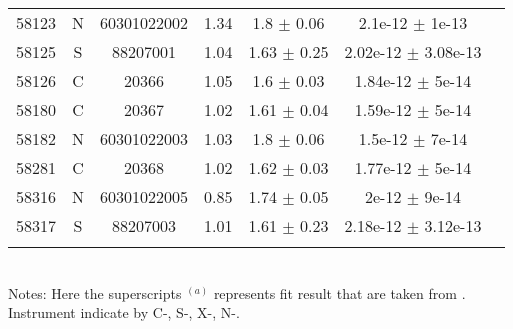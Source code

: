 \begin{table}
\begin{tabular}{lcccccc}
58123 & N & 60301022002 & 1.34 & 1.8 $\pm$ 0.06 & 2.1e-12 $\pm$ 1e-13 \\ 
58125 & S & 88207001 & 1.04 & 1.63 $\pm$ 0.25 & 2.02e-12 $\pm$ 3.08e-13 \\ 
58126 & C & 20366 & 1.05 & 1.6 $\pm$ 0.03 & 1.84e-12 $\pm$ 5e-14 \\ 
58180 & C & 20367 & 1.02 & 1.61 $\pm$ 0.04 & 1.59e-12 $\pm$ 5e-14 \\ 
58182 & N & 60301022003 & 1.03 & 1.8 $\pm$ 0.06 & 1.5e-12 $\pm$ 7e-14 \\ 
58281 & C & 20368 & 1.02 & 1.62 $\pm$ 0.03 & 1.77e-12 $\pm$ 5e-14 \\ 
58316 & N & 60301022005 & 0.85 & 1.74 $\pm$ 0.05 & 2e-12 $\pm$ 9e-14 \\ 
58317 & S & 88207003 & 1.01 & 1.61 $\pm$ 0.23 & 2.18e-12 $\pm$ 3.12e-13 \\  \\ \hline
\end{tabular}\\
Notes: Here the superscripts $^{(a)}$ represents fit result that are taken from \citet{2017A&A...607L...9K}. Instrument indicate by C-\chandra, S-\swift, X-\xmm, N-\nustar. 
\end{table}